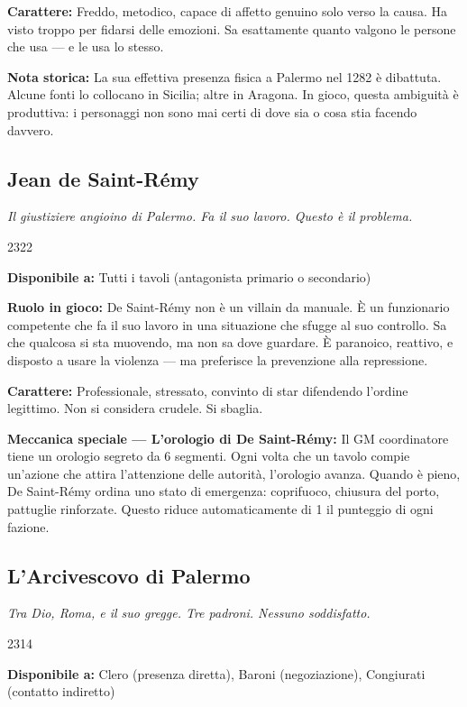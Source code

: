\textbf{Carattere:} Freddo, metodico, capace di affetto genuino solo
verso la causa. Ha visto troppo per fidarsi delle emozioni. Sa esattamente
quanto valgono le persone che usa — e le usa lo stesso.

\textbf{Nota storica:} La sua effettiva presenza fisica a Palermo nel
1282 è dibattuta. Alcune fonti lo collocano in Sicilia; altre in Aragona.
In gioco, questa ambiguità è produttiva: i personaggi non sono mai
certi di dove sia o cosa stia facendo davvero.

\filetto

\subsection{Jean de Saint-Rémy}
\textit{Il giustiziere angioino di Palermo. Fa il suo lavoro. Questo è il problema.}

%
{2}{3}{2}{2}

\textbf{Disponibile a:} Tutti i tavoli (antagonista primario o secondario)

\textbf{Ruolo in gioco:} De Saint-Rémy non è un villain da manuale.
È un funzionario competente che fa il suo lavoro in una situazione
che sfugge al suo controllo. Sa che qualcosa si sta muovendo, ma
non sa dove guardare. È paranoico, reattivo, e disposto a usare
la violenza — ma preferisce la prevenzione alla repressione.

\textbf{Carattere:} Professionale, stressato, convinto di star
difendendo l'ordine legittimo. Non si considera crudele. Si sbaglia.

\textbf{Meccanica speciale — L'orologio di De Saint-Rémy:} Il GM
coordinatore tiene un orologio segreto da 6 segmenti. Ogni volta che
un tavolo compie un'azione che attira l'attenzione delle autorità,
l'orologio avanza. Quando è pieno, De Saint-Rémy ordina uno stato
di emergenza: coprifuoco, chiusura del porto, pattuglie rinforzate.
Questo riduce automaticamente di 1 il punteggio di ogni fazione.

\filetto

\subsection{L'Arcivescovo di Palermo}
\textit{Tra Dio, Roma, e il suo gregge. Tre padroni. Nessuno soddisfatto.}

%
{2}{3}{1}{4}

\textbf{Disponibile a:} Clero (presenza diretta), Baroni (negoziazione),
Congiurati (contatto indiretto)

